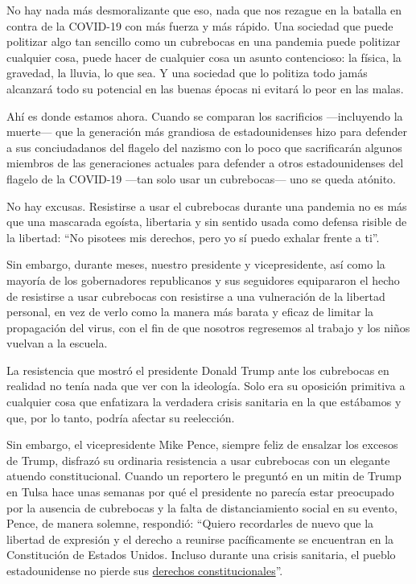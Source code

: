 No hay nada más desmoralizante que eso, nada que nos rezague en la
batalla en contra de la COVID-19 con más fuerza y más rápido. Una
sociedad que puede politizar algo tan sencillo como un cubrebocas en una
pandemia puede politizar cualquier cosa, puede hacer de cualquier cosa
un asunto contencioso: la física, la gravedad, la lluvia, lo que sea. Y
una sociedad que lo politiza todo jamás alcanzará todo su potencial en
las buenas épocas ni evitará lo peor en las malas.

Ahí es donde estamos ahora. Cuando se comparan los sacrificios
---incluyendo la muerte--- que la generación más grandiosa de
estadounidenses hizo para defender a sus conciudadanos del flagelo del
nazismo con lo poco que sacrificarán algunos miembros de las
generaciones actuales para defender a otros estadounidenses del flagelo
de la COVID-19 ---tan solo usar un cubrebocas--- uno se queda atónito.

No hay excusas. Resistirse a usar el cubrebocas durante una pandemia no
es más que una mascarada egoísta, libertaria y sin sentido usada como
defensa risible de la libertad: ``No pisotees mis derechos, pero yo sí
puedo exhalar frente a ti''.

Sin embargo, durante meses, nuestro presidente y vicepresidente, así
como la mayoría de los gobernadores republicanos y sus seguidores
equipararon el hecho de resistirse a usar cubrebocas con resistirse a
una vulneración de la libertad personal, en vez de verlo como la manera
más barata y eficaz de limitar la propagación del virus, con el fin de
que nosotros regresemos al trabajo y los niños vuelvan a la escuela.

La resistencia que mostró el presidente Donald Trump ante los cubrebocas
en realidad no tenía nada que ver con la ideología. Solo era su
oposición primitiva a cualquier cosa que enfatizara la verdadera crisis
sanitaria en la que estábamos y que, por lo tanto, podría afectar su
reelección.

Sin embargo, el vicepresidente Mike Pence, siempre feliz de ensalzar los
excesos de Trump, disfrazó su ordinaria resistencia a usar cubrebocas
con un elegante atuendo constitucional. Cuando un reportero le preguntó
en un mitin de Trump en Tulsa hace unas semanas por qué el presidente no
parecía estar preocupado por la ausencia de cubrebocas y la falta de
distanciamiento social en su evento, Pence, de manera solemne,
respondió: ``Quiero recordarles de nuevo que la libertad de expresión y
el derecho a reunirse pacíficamente se encuentran en la Constitución de
Estados Unidos. Incluso durante una crisis sanitaria, el pueblo
estadounidense no pierde sus
\href{https://www.esquire.com/news-politics/politics/a32984272/mike-pence-masks-social-distancing-trump-rallies/}{derechos
constitucionales}''.

